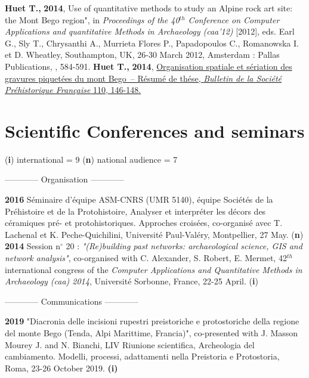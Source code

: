 \documentclass[11pt]{report} %
\begin{document}
\smallbreak
\textbf{Huet T.,} \textbf{2014}, Use of quantitative methods to study an Alpine rock art site: the Mont Bego region", in \textit{Proceedings of the 40${}^{th}$ Conference on Computer Applications and quantitative Methods in Archaeology (caa'12) }[2012], eds. Earl G., Sly T., Chrysanthi A., Murrieta Flores P., Papadopoulos C., Romanowska I. et D. Wheatley, Southampton, UK, 26-30 March 2012, Amsterdam : Pallas Publications, , 584-591.
\smallbreak
\textbf{Huet T.,} \textbf{2014}, \href{https://www.persee.fr/doc/bspf_0249-7638_2013_num_110_1_14242}{Organisation spatiale et s\'{e}riation des gravures piquet\'{e}es du mont Bego~-- R\'{e}sum\'{e} de th\'{e}se, \textit{Bulletin de la Soci\'{e}t\'{e} Pr\'{e}historique Fran\c{c}aise} 110, 146-148.}

\section*{Scientific Conferences and seminars }
\begin{center}(\textbf{i}) international = 9 {\textbar} (\textbf{n}) national audience = 7 \end{center}
\smallbreak
\begin{center}------------ Organisation ------------\end{center}
\smallbreak
\textbf{2016 }S\'{e}minaire d'\'{e}quipe ASM-CNRS (UMR 5140), \'{e}quipe Soci\'{e}t\'{e}s de la Pr\'{e}histoire et de la Protohistoire, Analyser et interpr\'{e}ter les d\'{e}cors des c\'{e}ramiques pr\'{e}- et protohistoriques. Approches crois\'{e}es, co-organis\'{e} avec T. Lachenal et K. Peche-Quichilini, Universit\'{e} Paul-Val\'{e}ry, Montpellier, 27 May. (\textbf{n})
\smallbreak
\textbf{2014 }Session n$\mathrm{{}^\circ}$ 20 :\textit{ "(Re)building past networks: archaeological science, GIS and network analysis"}, co-organised with C. Alexander, S. Robert, E. Mermet, 42${}^{th}$ international congress of the \textit{Computer Applications and Quantitative Methods in Archaeology (caa) 2014}, Universit\'{e} Sorbonne, France, 22-25 April. (\textbf{i})
\bigbreak
\begin{center}------------ Communications ------------\end{center}
\smallbreak
\textbf{2019 }"Diacronia delle incisioni rupestri preistoriche e protostoriche della regione del monte Bego (Tenda, Alpi Marittime, Francia)", co-presented with J. Masson Mourey J. and N. Bianchi, LIV Riunione scientifica, Archeologia del cambiamento. Modelli, processi, adattamenti nella Preistoria e Protostoria, Roma, 23-26 October 2019. \textbf{(i)}
\end{document}
